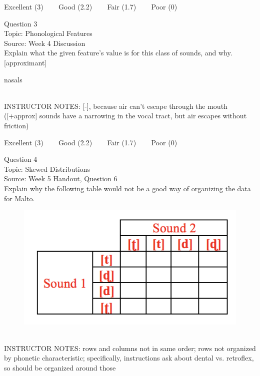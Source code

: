 \documentclass[12pt]{article}
\begin{document}
\vfill
Excellent (3) ~~~ Good (2.2) ~~~ Fair (1.7) ~~~ Poor (0)
\newpage

{\large Question 3}\\

Topic: Phonological Features\\
Source: Week 4 Discussion\\

Explain what the given feature’s value is for this class of sounds, and why.\\

{[approximant]}

nasals


~\\
INSTRUCTOR NOTES: [-], because air can't escape through the mouth ([+approx] sounds have a narrowing in the vocal tract, but air escapes without friction)


\vfill
Excellent (3) ~~~ Good (2.2) ~~~ Fair (1.7) ~~~ Poor (0)
\newpage

{\large Question 4}\\

Topic: Skewed Distributions\\
Source: Week 5 Handout, Question 6\\

Explain why the following table would not be a good way of organizing the data for Malto.\\

\begin{figure}[H]
\includegraphics{../images/Malto_table_bad.png}
\end{figure}

~\\
INSTRUCTOR NOTES: rows and columns not in same order; rows not organized by phonetic characteristic; specifically, instructions ask about dental vs. retroflex, so should be organized around those
\end{document}
